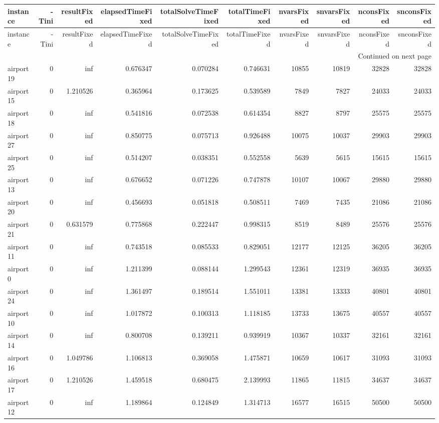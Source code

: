 \begin{longtable}{|l|r|r|r|r|r|r|r|r|r|}
\toprule
instance & -Tini & resultFixed & elapsedTimeFixed & totalSolveTimeFixed & totalTimeFixed & nvarsFixed & snvarsFixed & nconsFixed & snconsFixed \\
\midrule
\endfirsthead
\toprule
instance & -Tini & resultFixed & elapsedTimeFixed & totalSolveTimeFixed & totalTimeFixed & nvarsFixed & snvarsFixed & nconsFixed & snconsFixed \\
\midrule
\endhead
\midrule
\multicolumn{10}{r}{Continued on next page} \\
\midrule
\endfoot
\bottomrule
\endlastfoot
airport19 & 0 & inf & 0.676347 & 0.070284 & 0.746631 & 10855 & 10819 & 32828 & 32828 \\
airport15 & 0 & 1.210526 & 0.365964 & 0.173625 & 0.539589 & 7849 & 7827 & 24033 & 24033 \\
airport18 & 0 & inf & 0.541816 & 0.072538 & 0.614354 & 8827 & 8797 & 25575 & 25575 \\
airport27 & 0 & inf & 0.850775 & 0.075713 & 0.926488 & 10075 & 10037 & 29903 & 29903 \\
airport25 & 0 & inf & 0.514207 & 0.038351 & 0.552558 & 5639 & 5615 & 15615 & 15615 \\
airport13 & 0 & inf & 0.676652 & 0.071226 & 0.747878 & 10107 & 10067 & 29880 & 29880 \\
airport20 & 0 & inf & 0.456693 & 0.051818 & 0.508511 & 7469 & 7435 & 21086 & 21086 \\
airport21 & 0 & 0.631579 & 0.775868 & 0.222447 & 0.998315 & 8519 & 8489 & 25576 & 25576 \\
airport11 & 0 & inf & 0.743518 & 0.085533 & 0.829051 & 12177 & 12125 & 36205 & 36205 \\
airport0 & 0 & inf & 1.211399 & 0.088144 & 1.299543 & 12361 & 12319 & 36935 & 36935 \\
airport24 & 0 & inf & 1.361497 & 0.189514 & 1.551011 & 13381 & 13333 & 40801 & 40801 \\
airport10 & 0 & inf & 1.017872 & 0.100313 & 1.118185 & 13733 & 13675 & 40557 & 40557 \\
airport14 & 0 & inf & 0.800708 & 0.139211 & 0.939919 & 10367 & 10337 & 32161 & 32161 \\
airport16 & 0 & 1.049786 & 1.106813 & 0.369058 & 1.475871 & 10659 & 10617 & 31093 & 31093 \\
airport17 & 0 & 1.210526 & 1.459518 & 0.680475 & 2.139993 & 11865 & 11815 & 34637 & 34637 \\
airport12 & 0 & inf & 1.189864 & 0.124849 & 1.314713 & 16577 & 16515 & 50500 & 50500 \\

\end{longtable}
